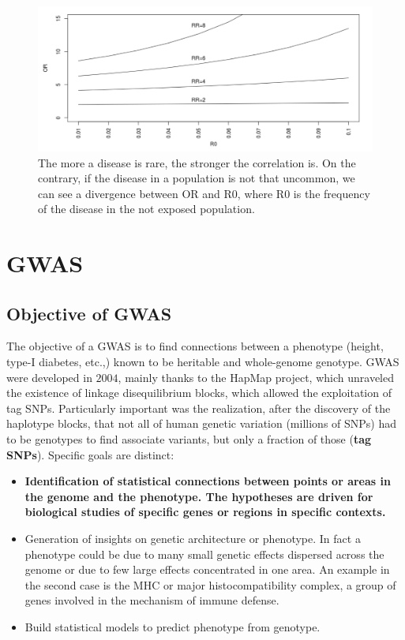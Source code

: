 		\begin{figure}[H]
		\centering
		\includegraphics[scale=0.3]{divergence}
		\caption{The more a disease is rare, the stronger the correlation is. On the contrary, if the disease in a population is not that uncommon, we can see a divergence between OR and R0, where R0 is the frequency of the disease in the not exposed population.}
		\label{fig:divergence}
		\end{figure}



\section{GWAS}
	\subsection{Objective of GWAS}
	The objective of a GWAS is to find connections between a phenotype (height, type-I diabetes, etc.,) known to be heritable and whole-genome genotype.
	GWAS were developed in $2004$, mainly thanks to the HapMap project, which unraveled the existence of linkage disequilibrium blocks, which allowed the exploitation of tag SNPs.
	Particularly important was the realization, after the discovery of the haplotype blocks, that not all of human genetic variation (millions of SNPs) had to be genotypes to find associate variants, but  only a fraction of those (\textbf{tag SNPs}).
	Specific goals are distinct:

		\begin{itemize}
			\item \textbf{Identification of statistical connections between points or areas in the genome and the phenotype.
				The hypotheses are driven for biological studies of specific genes or regions in specific contexts.}
			\item Generation of insights on genetic architecture or phenotype.
				In fact a phenotype could be due to many small genetic effects dispersed across the genome or due to few large effects concentrated in one area.
				An example in the second case is the MHC or major histocompatibility complex, a group of genes involved in the mechanism of immune defense.
			\item Build statistical models to predict phenotype from genotype.
		\end{itemize}


